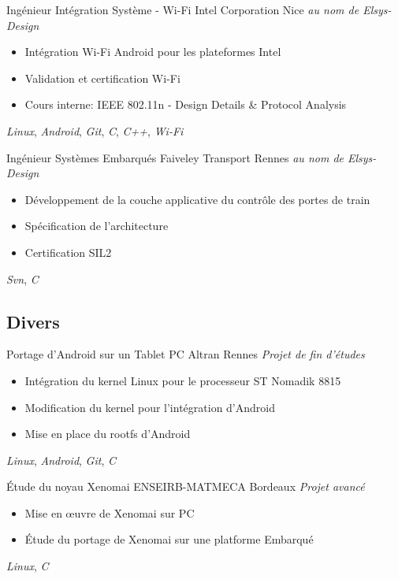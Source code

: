 \documentclass[11pt,a4paper,sans]{moderncv}
\begin{document}
	{Ingénieur Intégration Système - Wi-Fi}
	{Intel Corporation}
	{Nice}
	{\textit{au nom de Elsys-Design}}
	{
		\begin{itemize}
		\item Intégration Wi-Fi Android pour les plateformes Intel
		\item Validation et certification Wi-Fi
		\item Cours interne: IEEE 802.11n
			- Design Details \& Protocol Analysis
		\end{itemize}
		\textit{Linux}, \textit{Android},
		\textit{Git},
		\textit{C}, \textit{C++},
		\textit{Wi-Fi}
	}
	{Ingénieur Systèmes Embarqués}
	{Faiveley Transport}
	{Rennes}
	{\textit{au nom de Elsys-Design}}
	{
		\begin{itemize}
		\item Développement de la couche applicative du contrôle des
			portes de train
		\item Spécification de l'architecture
		\item Certification SIL2
		\end{itemize}
		\textit{Svn},
		\textit{C}
	}

\subsection{Divers}
	{Portage d'Android sur un Tablet PC}
	{Altran}
	{Rennes}
	{\textit{Projet de fin d'études}}
	{
		\begin{itemize}
		\item Intégration du kernel Linux pour le processeur ST Nomadik 8815
		\item Modification du kernel pour l'intégration d'Android
		\item Mise en place du rootfs d'Android
		\end{itemize}
		\textit{Linux}, \textit{Android},
		\textit{Git},
		\textit{C}
	}
	{Étude du noyau Xenomai}
	{ENSEIRB-MATMECA}
	{Bordeaux}
	{\textit{Projet avancé}}
	{
		\begin{itemize}
		\item Mise en \oe{}uvre de Xenomai sur PC
		\item Étude du portage de Xenomai sur une platforme Embarqué
		\end{itemize}
		\textit{Linux}, \textit{C}
	}

\clearpage
\end{document}
